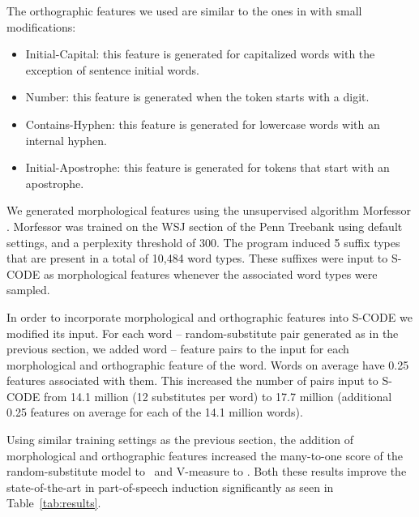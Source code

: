 
The orthographic features we used are similar to the ones in
\cite{bergkirkpatrick-EtAl:2010:NAACLHLT} with small modifications:

\begin{itemize}
\item Initial-Capital: this feature is generated for capitalized words
  with the exception of sentence initial words.
\item Number: this feature is generated when the token starts with a
  digit.
\item Contains-Hyphen: this feature is generated for lowercase words
  with an internal hyphen.
\item Initial-Apostrophe: this feature is generated for tokens that
  start with an apostrophe.
\end{itemize}

We generated morphological features using the unsupervised algorithm
Morfessor \cite{creutz05}.  Morfessor was trained on the WSJ section
of the Penn Treebank using default settings, and a perplexity
threshold of 300.  The program induced 5 suffix types that are present
in a total of 10,484 word types.  These suffixes were input to S-CODE
as morphological features whenever the associated word types were
sampled.

In order to incorporate morphological and orthographic features into
S-CODE we modified its input.  For each word -- random-substitute pair
generated as in the previous section, we added word -- feature pairs
to the input for each morphological and orthographic feature of the
word.  Words on average have 0.25 features associated with them.
This increased the number of pairs input to S-CODE from 14.1
million (12 substitutes per word) to 17.7 million (additional 0.25
features on average for each of the 14.1 million words).

Using similar training settings as the previous section, the addition
of morphological and orthographic features increased the many-to-one
score of the random-substitute model to \ftmto\ and V-measure to \ftvm.
Both these results improve the state-of-the-art in part-of-speech
induction significantly as seen in Table~\ref{tab:results}.

